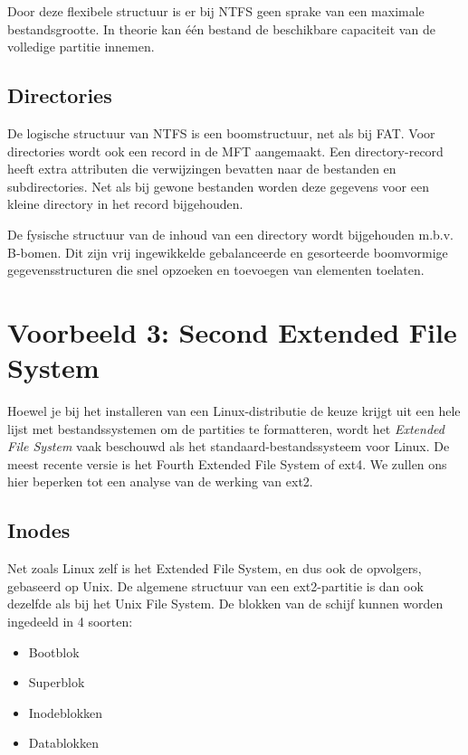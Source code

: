Door deze flexibele structuur is er bij NTFS geen sprake van een
maximale bestandsgrootte. In theorie kan \'e\'en bestand de beschikbare
capaciteit van de volledige partitie innemen.

\subsection{Directories}

De logische structuur van NTFS is een boomstructuur, net als bij
FAT. Voor directories wordt ook een record in de MFT aangemaakt. Een
directory-record heeft extra attributen die verwijzingen bevatten naar
de bestanden en subdirectories. Net als bij gewone bestanden worden
deze gegevens voor een kleine directory in het record
bijgehouden.

De fysische structuur van de inhoud van een directory wordt
bijgehouden m.b.v. B-bomen. Dit zijn vrij ingewikkelde gebalanceerde
en gesorteerde boomvormige gegevensstructuren die snel opzoeken en
toevoegen van elementen toelaten.

\section{Voorbeeld 3: Second Extended File System}

Hoewel je bij het installeren van een Linux-distributie de keuze krijgt
uit een hele lijst met bestandssystemen om de partities te formatteren,
wordt het \emph{Extended File System} vaak beschouwd als het standaard-bestandssysteem
voor Linux. De meest recente versie is het Fourth Extended File System of ext4. We zullen
ons hier beperken tot een analyse van de werking van ext2.

\subsection{Inodes}

Net zoals Linux zelf is het Extended File System, en dus ook de opvolgers, gebaseerd op
Unix. De algemene structuur van een ext2-partitie is dan ook dezelfde als bij het
Unix File System. De blokken van de schijf kunnen worden ingedeeld in 4 soorten:

\begin{itemize}
\item Bootblok
\item Superblok
\item Inodeblokken
\item Datablokken
\end{itemize}

